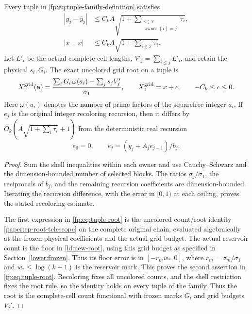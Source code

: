 \begin{corollary}
\label{fp:cor:targets}
Every tuple in \eqref{fp:eq:tuple-family-definition} satisfies
\begin{align}
 |y_j-\bar y_j|&\le C_kA
       \sqrt{1+\sum_{\substack{i\in\mathcal I\\
                                      \operatorname{owner}(i)=j}}\tau_i},
       \label{fp:eq:y-error}\\
 |x-\bar x|&\le C_kA\sqrt{1+\sum_{i\in\mathcal I}\tau_i}.
       \label{fp:eq:x-error}
\end{align}
Let $L'_i$ be the actual complete-cell lengths,
$V'_j=\sum_{i\le j}L'_i$, and retain the physical $s_i,G_i$.
The exact uncolored grid root on a tuple is
\begin{equation}
 X_1^{\rm grid}(\mathbf a)=
    \frac{\sum_iG_i\,\omega(a_i)-\sum_js_jV'_j}{\sigma_1},
 \qquad
 X_1^{\rm grid}=x+\epsilon,\qquad -C_k\le\epsilon\le0.
 \label{fp:eq:tuple-root}
\end{equation}
Here $\omega(a_i)$ denotes the number of prime factors of the
squarefree integer $a_i$. If $e_j$ is the original integer recoloring
recursion, then it differs by
$O_k(A\sqrt{1+\sum_i\tau_i}+1)$ from the deterministic real recursion
\[
 \bar e_0=0,\qquad
 \bar e_j=(\bar y_j+A_j\bar e_{j-1})/b_j.
\]
\end{corollary}
\begin{proof}
Sum the shell inequalities within each owner and use Cauchy--Schwarz
and the dimension-bounded number of selected blocks. The ratios
$\sigma_j/\sigma_1$, the reciprocals of $b_j$, and the remaining
recursion coefficients are dimension-bounded. Iterating the
recursion difference, with the error in $[0,1)$ at each ceiling,
proves the stated recoloring estimate.

The first expression in \eqref{fp:eq:tuple-root} is the uncolored
count/root identity \eqref{paper:ep-root-telescope} on the complete
original chain, evaluated algebraically at the frozen physical
coefficients and the actual grid budget.
The actual reservoir count is the floor in \eqref{ld:new-root},
using this grid budget as specified in Section~\ref{lower:frozen}.
Thus its floor error is in $[-r_m w_*,0]$, where
$r_m=\sigma_m/\sigma_1$ and $w_*\le\log(k+1)$ is the reservoir
mark. This proves the second assertion in
\eqref{fp:eq:tuple-root}. Recoloring fixes all uncolored counts,
and the shell restriction fixes the root rule, so the identity
holds on every tuple of the family. Thus the root is the complete-cell
count functional with frozen marks $G_i$ and grid budgets $V_j'$.
\end{proof}

